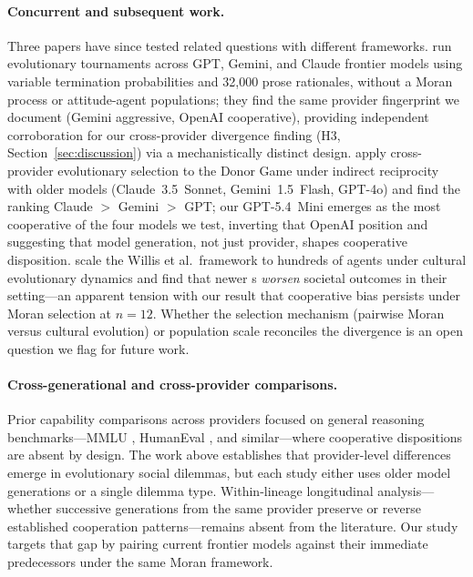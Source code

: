\paragraph{Concurrent and subsequent work.}
Three papers have since tested related questions with different frameworks.
\citet{Payne2025_strategic} run evolutionary \IPD tournaments across GPT, Gemini,
and Claude frontier models using variable termination probabilities and 32,000
prose rationales, without a Moran process or attitude-agent populations; they
find the same provider fingerprint we document (Gemini aggressive, OpenAI
cooperative), providing independent corroboration for our cross-provider
divergence finding (H3, Section~\ref{sec:discussion}) via a mechanistically
distinct design. \citet{Vallinder2024_cultural} apply cross-provider evolutionary
selection to the Donor Game under indirect reciprocity with older models
(Claude~3.5~Sonnet, Gemini~1.5~Flash, GPT-4o) and find the ranking
Claude $>$ Gemini $>$ GPT; our GPT-5.4~Mini emerges as the most cooperative of
the four models we test, inverting that OpenAI position and suggesting that model
generation, not just provider, shapes cooperative disposition.
\citet{Willis2026_collective} scale the Willis et al.\ framework to hundreds of
agents under cultural evolutionary dynamics and find that newer \LLM{}s
\emph{worsen} societal outcomes in their setting---an apparent tension with our
result that cooperative bias persists under Moran selection at $n{=}12$. Whether
the selection mechanism (pairwise Moran versus cultural evolution) or population
scale reconciles the divergence is an open question we flag for future work.

\paragraph{Cross-generational and cross-provider comparisons.}
Prior capability comparisons across \LLM providers focused on general reasoning
benchmarks---MMLU \citep{Hendrycks2021_mmlu}, HumanEval \citep{Chen2021_humaneval},
and similar---where cooperative dispositions are absent by design. The work above establishes that provider-level differences emerge in
evolutionary social dilemmas, but each study either uses older model generations
or a single dilemma type. Within-lineage longitudinal analysis---whether
successive generations from the same provider preserve or reverse established
cooperation patterns---remains absent from the literature. Our study targets that
gap by pairing current frontier models against their immediate predecessors under
the same Moran \IPD framework.

